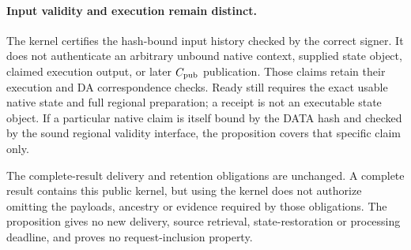 \paragraph{Input validity and execution remain distinct.}
The kernel certifies the hash-bound input history checked by the
correct signer. It does not authenticate an arbitrary unbound native
context, supplied state object, claimed execution output, or later
$C_{\rm pub}$ publication. Those claims retain their execution and DA
correspondence checks. Ready still requires the exact usable native
state and full regional preparation; a receipt is not an executable
state object. If a particular native claim is itself bound by the DATA
hash and checked by the sound regional validity interface, the
proposition covers that specific claim only.

The complete-result delivery and retention obligations are unchanged.
A complete result contains this public kernel, but using the kernel
does not authorize omitting the payloads, ancestry or evidence required
by those obligations. The proposition gives no new delivery, source
retrieval, state-restoration or processing deadline, and proves no
request-inclusion property.

